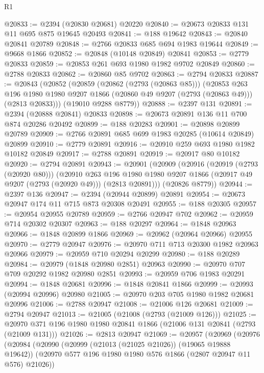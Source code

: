 \begin{lexlean}{R1}
\begin{coremodule}
@20833 := @2394 (@20830 @20681) @20220
@20840 := @20673 @20833 @131 @11 @695 @875 @19645 @20493
@20841 := @188 @19642
@20843 := @20840 @20841 @20789
@20848 := @2766 @20833 @685 @694 @1983 @19644
@20849 := @9668 @1866
@20852 := @20848 (@10148 @20849) @20841
@20853 := @2779 @20833
@20859 := @20853 @261 @693 @1980 @1982 @9702 @20849
@20860 := @2788 @20833
@20862 := @20860 @85 @9702
@20863 := @2794 @20833
@20887 := @20843
    (@20852
      (@20859
        (@20862 (@2793 (@20863 @85)))
        (@20853
          @263
          @196
          @1980
          @1980
          @9207
          @1866
          (@20860 @49 @9207 (@2793 (@20863 @49)))
          (@2813 @20833)))
      (@19010 @9288 @8779))
@20888 := @2397 @131
@20891 := @2394 (@20888 @20841) @20833
@20898 := @20673 @20891 @136 @11 @700 @874 @20286 @20492
@20899 := @188 @20283
@20901 := @20898 @20899 @20789
@20909 := @2766 @20891 @685 @699 @1983 @20285 (@10614 @20849) @20899
@20910 := @2779 @20891
@20916 := @20910 @259 @693 @1980 @1982 @10182 @20849
@20917 := @2788 @20891
@20919 := @20917 @80 @10182
@20920 := @2794 @20891
@20943 := @20901
    (@20909
      (@20916
        (@20919 (@2793 (@20920 @80)))
        (@20910
          @263
          @196
          @1980
          @1980
          @9207
          @1866
          (@20917 @49 @9207 (@2793 (@20920 @49)))
          (@2813 @20891)))
      (@20826 @8779))
@20944 := @2397 @136
@20947 := @2394 (@20944 @20899) @20891
@20954 := @20673 @20947 @174 @11 @715 @873 @20308 @20491
@20955 := @188 @20305
@20957 := @20954 @20955 @20789
@20959 := @2766 @20947 @702
@20962 := @20959 @714 @20302 @20307
@20963 := @188 @20297
@20964 := @1848 @20963
@20966 := @1848 @20899 @1866
@20969 := @20962 (@20964 @20966) @20955
@20970 := @2779 @20947
@20976 := @20970 @711 @713 @20300 @1982 @20963 @20966
@20979 := @20959 @710 @20294 @20299
@20980 := @188 @20289
@20984 := @20979 (@1848 @20980 @2851) @20963
@20990 := @20970 @707 @709 @20292 @1982 @20980 @2851
@20993 := @20959 @706 @1983 @20291
@20994 := @1848 @20681
@20996 := @1848 @20841 @1866
@20999 := @20993 (@20994 @20996) @20980
@21005 := @20970 @203 @705 @1980 @1982 @20681 @20996
@21006 := @2788 @20947
@21008 := @21006 @126 @20681
@21009 := @2794 @20947
@21013 := @21005 (@21008 (@2793 (@21009 @126)))
@21025 := @20970 @371 @196 @1980 @1980 @20841 @1866 (@21006 @131 @20841 (@2793 (@21009 @131)))
@21026 := @2813 @20947
@21069 := @20957
    (@20969
      (@20976
        (@20984
          (@20990
            (@20999 (@21013 (@21025 @21026)) (@19065 @19888 @19642))
            (@20970 @577 @196 @1980 @1980 @576 @1866 (@2807 @20947 @11 @576) @21026))

\end{coremodule}
\end{lexlean}
